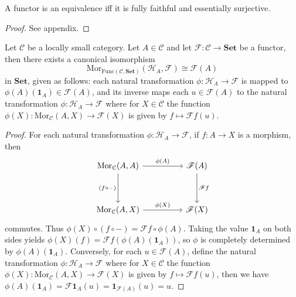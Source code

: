 \documentclass[11pt]{book}
\begin{document}
\begin{theorem}A functor is an equivalence iff it is fully faithful and essentially surjective.
\begin{proof}See appendix.
\end{proof}
\end{theorem}

\begin{theorem}\label{thm:yoneda}Let $\mathcal C$ be a locally small category. Let $A\in\mathcal C$ and let $\mathscr{F}:\mathcal C\rightarrow\mathbf{Set}$ be a functor, then there exists a canonical isomorphism
\[\mathrm{Mor}_{\mathrm{Func}(\mathcal C,\mathbf{Set})}(\mathscr{H}_A,\mathscr{F})\cong \mathscr{F}(A)\]
in $\mathbf{Set}$, given as follows: each natural transformation $\phi:\mathscr H_A\rightarrow\mathscr{F}$ is mapped to $\phi(A)(\mathbf 1_A)\in\mathscr{F}(A)$, and its inverse maps each $u\in\mathscr{F}(A)$ to the natural transformation $\phi:\mathscr H_A\rightarrow\mathscr{F}$ where for $X\in\mathcal C$ the function $\phi(X):\mathrm{Mor}_{\mathcal C}(A,X)\rightarrow \mathscr{F}(X)$ is given by $f\mapsto \mathscr{F}f(u)$.
\begin{proof}
For each natural transformation $\phi:\mathscr{H}_A\rightarrow\mathscr{F}$, if $f:A\rightarrow X$ is a morphism, then
\[
\begin{tikzcd}[sep = huge]
\mathrm{Mor}_{\mathcal C}(A,A) \arrow[r, "\phi(A)"] \arrow[d, "(f\circ -)"'] & \mathscr{F}(A) \arrow[d, "\mathscr{F}f"] \\
\mathrm{Mor}_{\mathcal C}(A,X) \arrow[r, "\phi(X)"]                 & \mathscr{F}(X)               
\end{tikzcd}\]
commutes. Thus $\phi(X)\circ (f\circ -)=\mathscr{F}f\circ \phi(A)$. Taking the value $\mathbf 1_A$ on both sides yields $\phi(X)(f)=\mathscr{F}f(\phi(A)(\mathbf 1_A))$, so $\phi$ is completely determined by $\phi(A)(\mathbf{1}_A)$. Conversely, for each $u\in\mathscr{F}(A)$, define the natural transformation $\phi:\mathscr H_A\rightarrow\mathscr{F}$ where for $X\in\mathcal C$ the function $\phi(X):\mathrm{Mor}_{\mathcal C}(A,X)\rightarrow \mathscr{F}(X)$ is given by $f\mapsto \mathscr{F}f(u)$, then we have $\phi(A)(\mathbf 1_A)=\mathscr{F}\mathbf 1_A(u)=\mathbf 1_{\mathscr{F}(A)}(u)=u$.
\end{proof}
\end{theorem}
\end{document}
